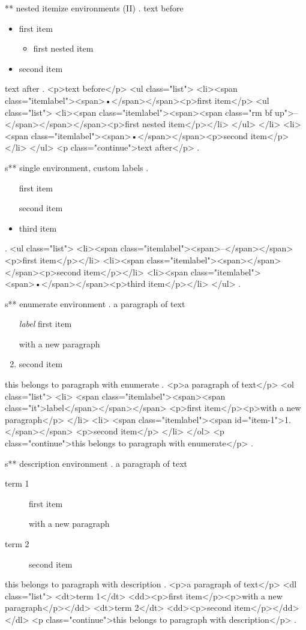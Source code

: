 ** nested itemize environments (II)
.
text before
\begin{itemize}
    \item first item
        \begin{itemize}
            \item first nested item
        \end{itemize}
    \item second item
\end{itemize}
text after
.
<p>text before</p>
<ul class="list">
<li><span class="itemlabel"><span>•</span></span><p>ﬁrst item</p>
<ul class="list">
<li><span class="itemlabel"><span><span class="rm bf up">–</span></span></span><p>ﬁrst nested item</p></li>
</ul>
</li>
<li><span class="itemlabel"><span>•</span></span><p>second item</p></li>
</ul>
<p class="continue">text after</p>
.


s** single environment, custom labels
.
\begin{itemize}
    \item[\textendash] first item
    \item[] second item
    \item third item
\end{itemize}
.
<ul class="list">
<li><span class="itemlabel"><span>–</span></span><p>ﬁrst item</p></li>
<li><span class="itemlabel"><span></span></span><p>second item</p></li>
<li><span class="itemlabel"><span>•</span></span><p>third item</p></li>
</ul>
.



s** enumerate environment
.
a paragraph of text

\begin{enumerate}
    \item[\itshape label] first item

        with a new paragraph
    \item second item
\end{enumerate}
this belongs to paragraph with enumerate
.
<p>a paragraph of text</p>
<ol class="list">
<li>
<span class="itemlabel"><span><span class="it">label</span></span></span>
<p>ﬁrst item</p><p>with a new paragraph</p>
</li>
<li>
<span class="itemlabel"><span id="item-1">1.</span></span>
<p>second item</p>
</li>
</ol>
<p class="continue">this belongs to paragraph with enumerate</p>
.


s** description environment
.
a paragraph of text

\begin{description}
    \item[term 1] first item

        with a new paragraph
    \item[term 2] second item
\end{description}
this belongs to paragraph with description
.
<p>a paragraph of text</p>
<dl class="list">
<dt>term 1</dt>
<dd><p>ﬁrst item</p><p>with a new paragraph</p></dd>
<dt>term 2</dt>
<dd><p>second item</p></dd>
</dl>
<p class="continue">this belongs to paragraph with description</p>
.

